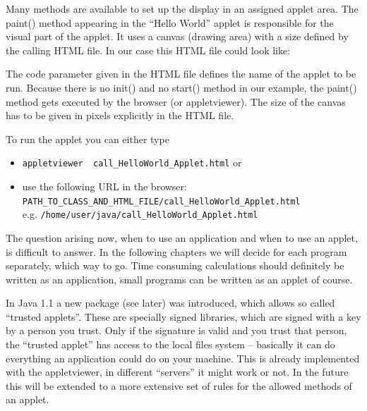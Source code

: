 Many methods are available to set up the display in an assigned applet area.
The paint() method appearing in the ``Hello World'' applet is
responsible for the visual part of the applet. It uses a canvas
(drawing area) with a size defined by the calling HTML file. In our case
this HTML file could look like:

The code parameter given in the HTML file defines the name of the applet
to be run. Because there is no init() and no start() method in our
example, the paint() method gets executed by the browser (or appletviewer).
The size of the canvas has to be given in pixels explicitly in the
HTML file.

To run the applet you can either type
\begin{itemize}
\item \verb|appletviewer  call_HelloWorld_Applet.html| or
\item use the following URL in the browser: \\
        \verb|PATH_TO_CLASS_AND_HTML_FILE/call_HelloWorld_Applet.html| \\
        e.g. \verb|/home/user/java/call_HelloWorld_Applet.html|
\end{itemize}

The question arising now, when to use an application and when to use
an applet, is difficult to answer. In the following chapters we will 
decide for each program
separately, which way to go. Time consuming calculations should
definitely be written as an application, small programs can be
written as an applet of course.

In Java 1.1 a new package (see later) was introduced, which allows
so called ``trusted applets''. These are specially signed libraries,
which are signed with a key by a person you trust. Only if the
signature is valid and you trust that person, the ``trusted applet''
has access to the local files system -- basically it can do everything
an application could do on your machine. This is already implemented with
the appletviewer, in different ``servers'' it might work or not. In the
future this will be extended to a more extensive set of rules for the
allowed methods of an applet.

